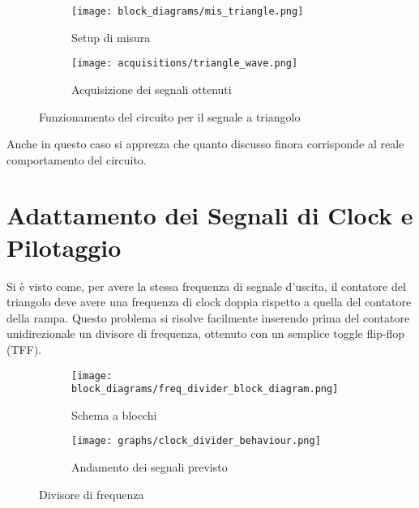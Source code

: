 \begin{figure}[H]
    \centering

    \begin{subfigure}{.5\textwidth}
        \centering
        \texttt{[image: block\_diagrams/mis\_triangle.png]}
        \caption{Setup di misura}
        \label{mis_triangle}
    \end{subfigure}%
    \begin{subfigure}{.5\textwidth}
        \centering
        \texttt{[image: acquisitions/triangle\_wave.png]}
        \caption{Acquisizione dei segnali ottenuti}
        \label{acq_triangle}
    \end{subfigure}

    \caption{Funzionamento del circuito per il segnale a triangolo}
    \label{acq_triangle_signals}
\end{figure}

Anche in questo caso si apprezza che quanto discusso finora corrisponde al reale comportamento
del circuito.


\section{Adattamento dei Segnali di Clock e Pilotaggio}


Si è visto come, per avere la stessa frequenza di segnale d'uscita, il contatore del
triangolo deve avere una frequenza di clock doppia rispetto a quella del contatore della
rampa. Questo problema si risolve facilmente inserendo prima del contatore unidirezionale
un divisore di frequenza, ottenuto con un semplice toggle flip-flop (TFF).

\begin{figure}[H]
    \centering

    \begin{subfigure}{.5\textwidth}
        \centering
        \texttt{[image: block\_diagrams/freq\_divider\_block\_diagram.png]}
        \caption{Schema a blocchi}
        \label{freq_divider_block_diagram}
    \end{subfigure}%
    \begin{subfigure}{.5\textwidth}
        \centering
        \texttt{[image: graphs/clock\_divider\_behaviour.png]}
        \caption{Andamento dei segnali previsto}
        \label{clock_divider_behaviour}
    \end{subfigure}

    \caption{Divisore di frequenza}
\end{figure}


